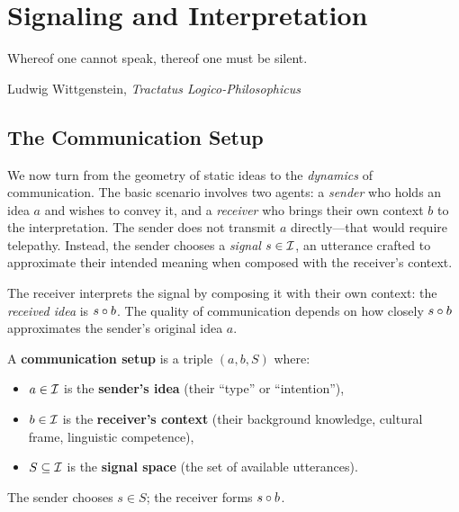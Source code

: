 \chapter{Signaling and Interpretation}
\label{ch:signaling}

\epigraph{Whereof one cannot speak, thereof one must be silent.}{Ludwig
Wittgenstein, \textit{Tractatus Logico-Philosophicus}}

\section{The Communication Setup}

We now turn from the geometry of static ideas to the \emph{dynamics} of
communication.  The basic scenario involves two agents: a \emph{sender} who
holds an idea $a$ and wishes to convey it, and a \emph{receiver} who brings
their own context $b$ to the interpretation.  The sender does not transmit $a$
directly---that would require telepathy.  Instead, the sender chooses a
\emph{signal} $s \in \mathcal{I}$, an utterance crafted to approximate their intended
meaning when composed with the receiver's context.

The receiver interprets the signal by composing it with their own context:
the \emph{received idea} is $s \circ b$.  The quality of communication
depends on how closely $s \circ b$ approximates the sender's original
idea $a$.

\begin{definition}
\label{def:comm-setup}
A \textbf{communication setup} is a triple $(a, b, S)$ where:
\begin{itemize}
\item $a \in \mathcal{I}$ is the \textbf{sender's idea} (their ``type'' or ``intention''),
\item $b \in \mathcal{I}$ is the \textbf{receiver's context} (their background knowledge,
  cultural frame, linguistic competence),
\item $S \subseteq \mathcal{I}$ is the \textbf{signal space} (the set of available
  utterances).
\end{itemize}
The sender chooses $s \in S$; the receiver forms $s \circ b$.
\end{definition}

